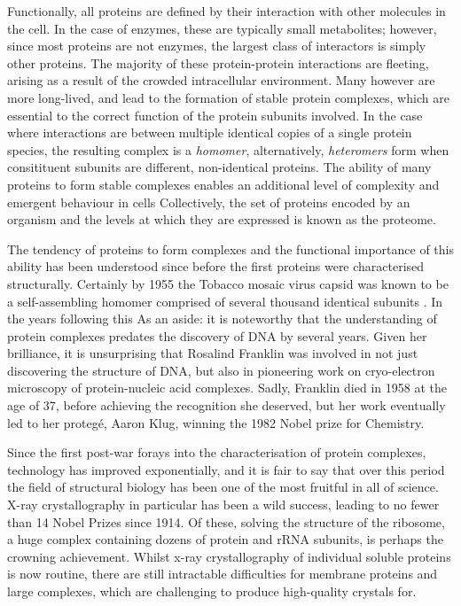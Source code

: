 \documentclass[a4paper,11pt,twoside,openright]{scrbook}
\let\cite\supercite
\begin{document}
Functionally, all proteins are defined by their interaction with other molecules in the cell. In the case of enzymes, these are typically small metabolites; however, since most proteins are not enzymes, the largest class of interactors is simply other proteins. The majority of these protein-protein interactions are fleeting, arising as a result of the crowded intracellular environment. Many however are more long-lived, and lead to the formation of stable protein complexes, which are essential to the correct function of the protein subunits involved. In the case where interactions are between multiple identical copies of a single protein species, the resulting complex is a \textit{homomer}, alternatively, \textit{heteromers} form when consitituent subunits are different, non-identical proteins. The ability of many proteins to form stable complexes enables an additional level of complexity and emergent behaviour in cells
Collectively, the set of proteins encoded by an organism and the levels at which they are expressed is known as the proteome.

The tendency of proteins to form complexes and the functional importance of this ability has been understood since before the first proteins were characterised structurally. Certainly by 1955 the Tobacco mosaic virus capsid was known to be a self-assembling homomer comprised of several thousand identical subunits \cite{Fraenkel-Conrat1955}. In the years following this %
As an aside: it is noteworthy that the understanding of protein complexes predates the discovery of DNA by several years. Given her brilliance, it is unsurprising that Rosalind Franklin was involved in not just discovering the structure of DNA, but also in pioneering work on cryo-electron microscopy of protein-nucleic acid complexes. Sadly, Franklin died in 1958 at the age of 37, before achieving the recognition she deserved, but her work eventually led to her proteg\'{e},  Aaron Klug, winning the 1982 Nobel prize for Chemistry. %

Since the first post-war forays into the characterisation of protein complexes, technology has improved exponentially, and it is fair to say that over this period the field of structural biology has been one of the most fruitful in all of science. X-ray crystallography in particular has been a wild success, leading to no fewer than 14 Nobel Prizes since 1914. Of these, solving the structure of the ribosome, a huge complex containing dozens of protein and rRNA subunits, is perhaps the crowning achievement. Whilst x-ray crystallography of individual soluble proteins is now routine, there are still intractable difficulties for membrane proteins and large complexes, which are challenging to produce high-quality crystals for.
\end{document}
